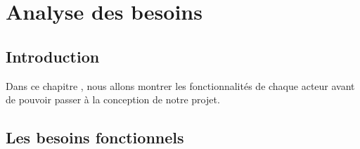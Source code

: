 \chapter{Analyse des besoins}

\section{Introduction}


Dans ce chapitre , nous allons montrer les fonctionnalités de chaque acteur
avant de pouvoir passer à la conception de notre projet.
 \section{ Les besoins fonctionnels}
